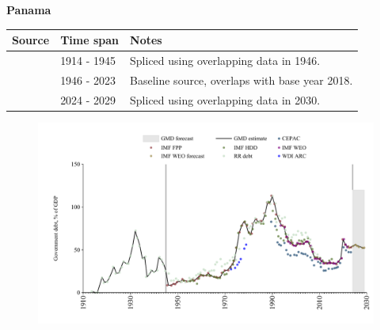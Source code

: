 \documentclass[12pt,a4paper,landscape]{article}
\begin{document}
\begin{adjustbox}{max totalsize={\paperwidth}{\paperheight},center}
\begin{minipage}[t][\textheight][t]{\textwidth}
\vspace*{0.5cm}
{}
\begin{center}
{\Large\bfseries Panama}
\end{center}
\vspace{0.5cm}
\begin{table}[H]
\centering
\small
\begin{tabular}{|l|l|l|}
\hline
\textbf{Source} & \textbf{Time span} & \textbf{Notes} \\
\hline
\rowcolor{white}\cite{RR_debt}& 1914 - 1945 &Spliced using overlapping data in 1946.\\
\rowcolor{lightgray}\cite{IMF_FPP}& 1946 - 2023 &Baseline source, overlaps with base year 2018.\\
\rowcolor{white}\cite{IMF_WEO_forecast}& 2024 - 2029 &Spliced using overlapping data in 2030.\\
\hline
\end{tabular}
\end{table}
\begin{figure}[H]
\centering
\includegraphics[width=\textwidth,height=0.6\textheight,keepaspectratio]{graphs/PAN_govdebt_GDP.pdf}
\end{figure}
\end{minipage}
\end{adjustbox}
\end{document}
